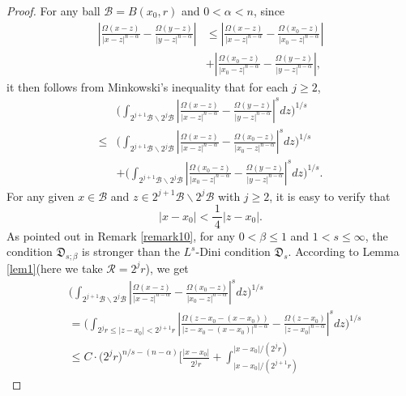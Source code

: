 \documentclass[preprint,10pt]{elsarticle}
\numberwithin{equation}{section}
\begin{document}
\begin{proof}
For any ball $\mathcal{B}=B(x_0,r)$ and $0<\alpha<n$, since
\begin{equation*}
\begin{split}
\left|\frac{\Omega(x-z)}{|x-z|^{n-\alpha}}-\frac{\Omega(y-z)}{|y-z|^{n-\alpha}}\right|
&\leq\left|\frac{\Omega(x-z)}{|x-z|^{n-\alpha}}-\frac{\Omega(x_0-z)}{|x_0-z|^{n-\alpha}}\right|\\
&+\left|\frac{\Omega(x_0-z)}{|x_0-z|^{n-\alpha}}-\frac{\Omega(y-z)}{|y-z|^{n-\alpha}}\right|,
\end{split}
\end{equation*}
it then follows from Minkowski's inequality that for each $j\geq2$,
\begin{equation*}
\begin{split}
&\bigg(\int_{2^{j+1}\mathcal{B}\backslash 2^j\mathcal{B}}
\left|\frac{\Omega(x-z)}{|x-z|^{n-\alpha}}-\frac{\Omega(y-z)}{|y-z|^{n-\alpha}}\right|^sdz\bigg)^{1/s}\\
\leq&
\bigg(\int_{2^{j+1}\mathcal{B}\backslash 2^j\mathcal{B}}\left|\frac{\Omega(x-z)}{|x-z|^{n-\alpha}}-\frac{\Omega(x_0-z)}{|x_0-z|^{n-\alpha}}\right|^sdz\bigg)^{1/s}\\
&+\bigg(\int_{2^{j+1}\mathcal{B}\backslash 2^j\mathcal{B}}
\left|\frac{\Omega(x_0-z)}{|x_0-z|^{n-\alpha}}-\frac{\Omega(y-z)}{|y-z|^{n-\alpha}}\right|^sdz\bigg)^{1/s}.
\end{split}
\end{equation*}
For any given $x\in\mathcal{B}$ and $z\in 2^{j+1}\mathcal{B}\backslash 2^j\mathcal{B}$ with $j\geq2$, it is easy to verify that
\begin{equation*}
|x-x_0|<\frac{\,1\,}{4}|z-x_0|.
\end{equation*}
As pointed out in Remark \ref{remark10}, for any $0<\beta\leq 1$ and $1<s\le\infty$, the condition $\mathfrak{D}_{s;\beta}$ is stronger than the $L^s$-Dini condition $\mathfrak{D}_{s}$. According to Lemma \ref{lem1}(here we take $\mathcal{R}=2^jr$), we get
\begin{equation*}
\begin{split}
&\bigg(\int_{2^{j+1}\mathcal{B}\backslash2^j\mathcal{B}}
\left|\frac{\Omega(x-z)}{|x-z|^{n-\alpha}}-\frac{\Omega(x_0-z)}{|x_0-z|^{n-\alpha}}\right|^sdz\bigg)^{1/s}\\
&=\bigg(\int_{2^jr\leq|z-x_0|<2^{j+1}r}\left|\frac{\Omega(z-x_0-(x-x_0))}{|z-x_0-(x-x_0)|^{n-\alpha}}
-\frac{\Omega(z-x_0)}{|z-x_0|^{n-\alpha}}\right|^sdz\bigg)^{1/s}\\
&\leq C\cdot\big(2^jr\big)^{n/s-(n-\alpha)}\bigg[\frac{|x-x_0|}{2^jr}+\int_{|x-x_0|/{(2^{j+1}r)}}^{|x-x_0|/{(2^jr)}}

\end{split}
\end{equation*}
\end{proof}
\end{document}
